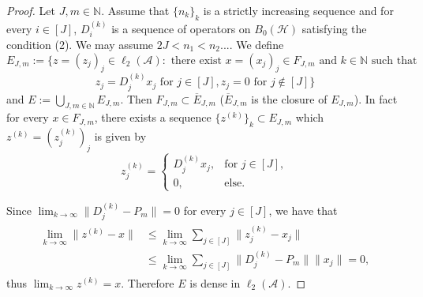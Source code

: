\documentclass{article}
\begin{document}
\begin{proof}
Let $J,m\in \mathbb{N}$. Assume that $\{n_{k}\}_{k}$ is a strictly increasing sequence and for every $i\in[J]$, $D^{(k)}_{i}$ is a sequence of operators on $B_{0}(\mathcal{H})$ satisfying the condition (2). We may assume $2J<n_{1}<n_{2}...$. We define
\[E_{J,m}:=\{z=(z_{j})_{j}\in \ell_{2}(\mathcal{A}): \textrm{ there exist } x=(x_{j})_{j}\in F_{J,m} \textrm{ and } k\in \mathbb{N} \textrm{ such that }\]
\[z_{j}=D^{(k)}_{j}x_{j} \textrm{ for } j\in [J], z_{j}=0 \textrm{ for } j\notin [J]\}\]
and $E:=\bigcup_{J,m\in\mathbb{N}}E_{J,m}$.
Then $F_{J,m}\subset \overline{E}_{J,m}$ ($\overline{E}_{J,m}$ is the closure of $E_{J,m}$). In fact for every $x\in F_{J,m}$, there exists a sequence $\{z^{(k)}\}_{k}\subset E_{J,m}$ which $z^{(k)}=(z^{(k)}_{j})_{j}$ is given by
\begin{displaymath}
z^{(k)}_{j}=\left\{ \begin{array}{ll}
 D^{(k)}_{j}x_{j}, & \textrm{for } j \in [J],\\
 0, & \textrm{else}.
\end{array} \right.
\end{displaymath}

Since $\lim_{k\rightarrow\infty}\|D^{(k)}_{j}-P_{m}\|=0$ for every $j\in[J]$, we have that
\begin{eqnarray}\begin{split}\nonumber
 \lim_{k\rightarrow\infty}\|z^{(k)}-x\|&\leq \lim_{k\rightarrow\infty}\sum_{j\in[J]}\|z^{(k)}_{j}-x_{j}\|
\\
&\leq\lim_{k\rightarrow\infty}\sum_{j\in[J]}\|D^{(k)}_{j}-P_{m}\|\|x_{j}\|=0,
\end{split}\end{eqnarray}
thus $\lim_{k\rightarrow\infty}z^{(k)}=x$. Therefore $E$ is dense in $\ell_{2}(\mathcal{A})$.


\end{proof}
\end{document}
